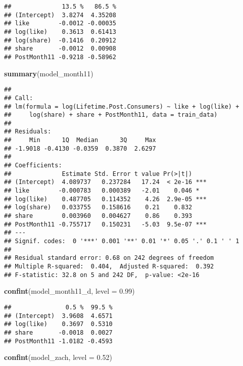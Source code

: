 \documentclass[
]{article}
\newenvironment{Shaded}{\begin{snugshade}}{\end{snugshade}}
\newcommand{\DataTypeTok}[1]{\textcolor[rgb]{0.13,0.29,0.53}{#1}}
\newcommand{\FloatTok}[1]{\textcolor[rgb]{0.00,0.00,0.81}{#1}}
\newcommand{\KeywordTok}[1]{\textcolor[rgb]{0.13,0.29,0.53}{\textbf{#1}}}
\newcommand{\NormalTok}[1]{#1}
\begin{document}
\begin{verbatim}
##              13.5 %   86.5 %
## (Intercept)  3.8274  4.35208
## like        -0.0012 -0.00035
## log(like)    0.3613  0.61413
## log(share)  -0.1416  0.20912
## share       -0.0012  0.00908
## PostMonth11 -0.9218 -0.58962
\end{verbatim}

\begin{Shaded}
\begin{Highlighting}[]
\KeywordTok{summary}\NormalTok{(model_month11)}
\end{Highlighting}
\end{Shaded}

\begin{verbatim}
## 
## Call:
## lm(formula = log(Lifetime.Post.Consumers) ~ like + log(like) + 
##     log(share) + share + PostMonth11, data = train_data)
## 
## Residuals:
##     Min      1Q  Median      3Q     Max 
## -1.9018 -0.4130 -0.0359  0.3870  2.6297 
## 
## Coefficients:
##              Estimate Std. Error t value Pr(>|t|)    
## (Intercept)  4.089737   0.237284   17.24  < 2e-16 ***
## like        -0.000783   0.000389   -2.01    0.046 *  
## log(like)    0.487705   0.114352    4.26  2.9e-05 ***
## log(share)   0.033755   0.158616    0.21    0.832    
## share        0.003960   0.004627    0.86    0.393    
## PostMonth11 -0.755717   0.150231   -5.03  9.5e-07 ***
## ---
## Signif. codes:  0 '***' 0.001 '**' 0.01 '*' 0.05 '.' 0.1 ' ' 1
## 
## Residual standard error: 0.68 on 242 degrees of freedom
## Multiple R-squared:  0.404,  Adjusted R-squared:  0.392 
## F-statistic: 32.8 on 5 and 242 DF,  p-value: <2e-16
\end{verbatim}

\begin{Shaded}
\begin{Highlighting}[]
\KeywordTok{confint}\NormalTok{(model_month11_d, }\DataTypeTok{level =} \FloatTok{0.99}\NormalTok{)}
\end{Highlighting}
\end{Shaded}

\begin{verbatim}
##               0.5 %  99.5 %
## (Intercept)  3.9608  4.6571
## log(like)    0.3697  0.5310
## share       -0.0018  0.0027
## PostMonth11 -1.0182 -0.4593
\end{verbatim}

\begin{Shaded}
\begin{Highlighting}[]
\KeywordTok{confint}\NormalTok{(model_zach, }\DataTypeTok{level =} \FloatTok{0.52}\NormalTok{)}
\end{Highlighting}
\end{Shaded}
\end{document}
